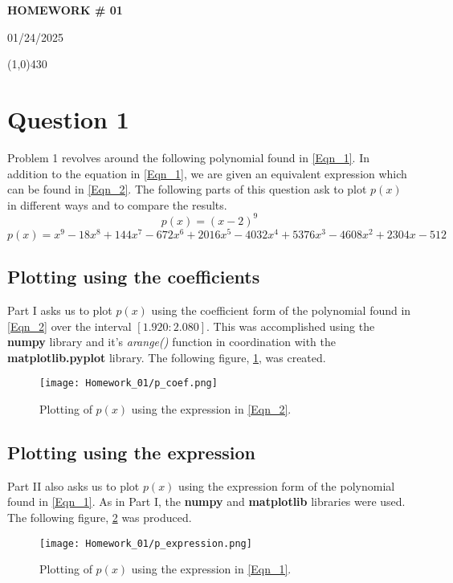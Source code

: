 \documentclass{article}
\begin{document}
\begin{center}
 \LARGE\bfseries HOMEWORK \# 01
\end{center}
\begin{center}
    01/24/2025
\end{center}
 \line(1,0){430}

\section{Question 1}
Problem 1 revolves around the following polynomial found in \ref{Eqn_1}. In addition to the equation in \ref{Eqn_1}, we are given an equivalent expression which can be found in \ref{Eqn_2}. The following parts of this question ask to plot \(p(x)\) in different ways and to compare the results.
\begin{equation}
    \label{Eqn_1}
    p(x) = (x-2)^9
\end{equation}
\begin{equation}
    \label{Eqn_2}
    p(x) = x^9 - 18x^8 + 144x^7 - 672x^6 + 2016x^5 - 4032x^4 + 5376x^3 - 4608x^2 + 2304x - 512
\end{equation}

\subsection{Plotting using the coefficients}
Part I asks us to plot \(p(x)\) using the coefficient form of the polynomial found in \ref{Eqn_2} over the interval \([1.920 : 2.080]\). This was accomplished using the \textbf{numpy} library and it's \textit{arange()} function in coordination with the \textbf{matplotlib.pyplot} library. The following figure, \ref{fig:p_coef}, was created.
\begin{figure}[h!]
    \centering
    \texttt{[image: Homework\_01/p\_coef.png]}
    \caption{Plotting of \(p(x)\) using the expression in \ref{Eqn_2}.}
    \label{fig:p_coef}
\end{figure}

\subsection{Plotting using the expression}
Part II also asks us to plot \(p(x)\) using the expression form of the polynomial found in \ref{Eqn_1}. As in Part I, the \textbf{numpy} and \textbf{matplotlib} libraries were used. The following figure, \ref{fig:p_expression} was produced.
\begin{figure}[h!]
    \centering
    \texttt{[image: Homework\_01/p\_expression.png]}
    \caption{Plotting of \(p(x)\) using the expression in \ref{Eqn_1}.}
    \label{fig:p_expression}
\end{figure}
\newpage
\end{document}
